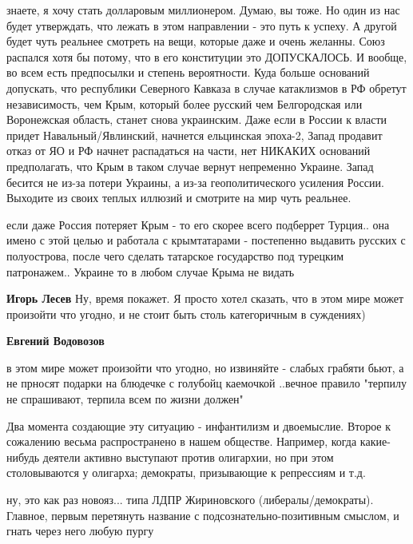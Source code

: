 \begin{itemize}
\begin{itemize}
знаете, я хочу стать долларовым миллионером. Думаю, вы тоже. Но один из нас
будет утверждать, что лежать в этом направлении - это путь к успеху. А другой
будет чуть реальнее смотреть на вещи, которые даже и очень желанны. Союз
распался хотя бы потому, что в его конституции это ДОПУСКАЛОСЬ. И вообще, во
всем есть предпосылки и степень вероятности. Куда больше оснований допускать,
что республики Северного Кавказа в случае катаклизмов в РФ обретут
независимость, чем Крым, который более русский чем Белгородская или Воронежская
область, станет снова украинским. Даже если в России к власти придет
Навальный/Явлинский, начнется ельцинская эпоха-2, Запад продавит отказ от ЯО и
РФ начнет распадаться на части, нет НИКАКИХ оснований предполагать, что Крым в
таком случае вернут непременно Украине. Запад бесится не из-за потери Украины,
а из-за геополитического усиления России. Выходите из своих теплых иллюзий и
смотрите на мир чуть реальнее.


если даже Россия потеряет Крым - то его скорее всего подберрет Турция.. она
имено с этой целью и работала с крымтатарами - постепенно выдавить русских с
полуострова, после чего сделать татарское государство под турецким патронажем..
Украине то в любом случае Крыма не видать

\textbf{Игорь Лесев} Ну, время покажет. Я просто хотел сказать, что в этом мире может произойти что угодно, и не стоит быть столь категоричным в суждениях)

\textbf{Евгений Водовозов} 

в этом мире может произойти что угодно, но извиняйте - слабых грабяти бьют, а
не прносят подарки на блюдечке с голубойц каемочкой ..вечное правило "терпилу
не спрашивают, терпила всем по жизни должен"

\end{itemize} %


Два момента создающие эту ситуацию - инфантилизм и двоемыслие. Второе к
сожалению весьма распространено в нашем обществе. Например, когда какие-нибудь
деятели активно выступают против олигархии, но при этом столовываются у
олигарха; демократы, призывающие к репрессиям и т.д.

\begin{itemize} %

ну, это как раз новояз... типа ЛДПР Жириновского (либералы/демократы). Главное,
первым перетянуть название с подсознательно-позитивным смыслом, и гнать через
него любую пургу


\end{itemize}
\end{itemize}
